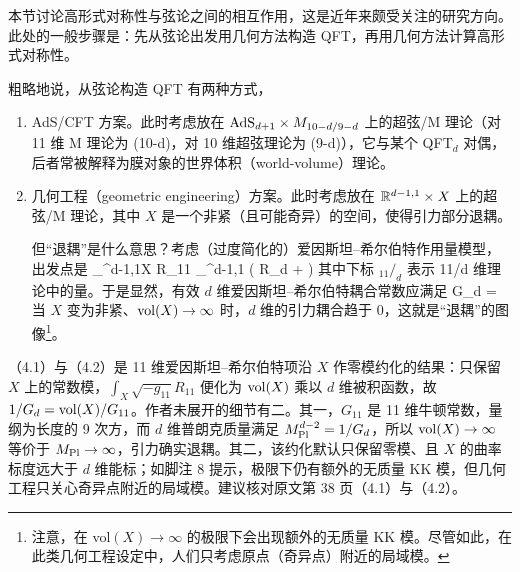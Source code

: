 本节讨论高形式对称性与弦论之间的相互作用，这是近年来颇受关注的研究方向\cite{DelZotto:2015isa,Bergman:2020ifi,Morrison:2020ool,Albertini:2020mdx,Bah:2020uev,Closset:2020scj,DelZotto:2020esg,Apruzzi:2020zot,Cvetic:2020kuw,BenettiGenolini:2020doj,Cordova:2020tij,DelZotto:2020sop,Gukov:2020btk,Heidenreich:2020pkc,Closset:2020afy,Apruzzi:2021phx,Apruzzi:2021vcu,Hosseini:2021ged,Cvetic:2021sxm,Buican:2021xhs,Braun:2021sex,Cvetic:2021maf,Cvetic:2021vsw,Apruzzi:2021mlh,Closset:2021lwy,Apruzzi:2021nmk,DelZotto:2022fnw,Genolini:2022mpi,Benini:2022hzx,Cvetic:2022imb,DelZotto:2022joo,Apruzzi:2022dlm,Hubner:2022kxr,Heckman:2022xgu,Heckman:2022suy,Damia:2022bcd,GarciaEtxebarria:2022vzq,Apruzzi:2022rei,vanBeest:2022fss,Heckman:2022muc,Antinucci:2022vyk,Grimm:2022xmj,Etheredge:2023ler,Amariti:2023hev,DelZotto:2023ahf,Acharya:2023bth,Cvetic:2023plv,Dierigl:2023jdp,Lawrie:2023tdz,Bah:2023ymy,Apruzzi:2023uma,Cvetic:2023pgm}。此处的一般步骤是：先从弦论出发用几何方法构造 QFT，再用几何方法计算高形式对称性。

粗略地说，从弦论构造 QFT 有两种方式，
\begin{enumerate}
    \item AdS/CFT 方案。此时考虑放在 ${\rm AdS}_{d+1} \times  M_{10-d / 9-d}$ 上的超弦/M 理论（对 11 维 M 理论为 (10-d)，对 10 维超弦理论为 (9-d)），它与某个 QFT$_d$ 对偶，后者常被解释为膜对象的世界体积（world-volume）理论。
    \item 几何工程（geometric engineering）方案。此时考虑放在 ${\mathbb{R}}^{d-1,1}\times X$ 上的超弦/M 理论，其中 $X$ 是一个非紧（且可能奇异）的空间，使得引力部分退耦。

    但“退耦”是什么意思？考虑（过度简化的）爱因斯坦–希尔伯特作用量模型，出发点是
    \be \int_{^{d-1,1}\times X}  R_{11}  \mapsto \int_{^{d-1,1}} ( R_{d} + \cdots)  \ee
    其中下标 $_{11}/ _{d}$ 表示 11/d 维理论中的量。于是显然，有效 $d$ 维爱因斯坦–希尔伯特耦合常数应满足
    \be G_d =  \ee
    当 $X$ 变为非紧、${\rm vol}(X)\to \infty$ 时，$d$ 维的引力耦合趋于 $0$，这就是“退耦”的图像\footnote{注意，在 vol$(X)\rightarrow\infty$ 的极限下会出现额外的无质量 KK 模。尽管如此，在此类几何工程设定中，人们只考虑原点（奇异点）附近的局域模。}。
\end{enumerate}

\begin{yizhu}
（4.1）与（4.2）是 11 维爱因斯坦–希尔伯特项沿 $X$ 作零模约化的结果：只保留 $X$ 上的常数模，$\int_X \sqrt{-g_{11}} R_{11}$ 便化为 ${\rm vol}(X)$ 乘以 $d$ 维被积函数，故 $1/G_d={\rm vol}(X)/G_{11}$。作者未展开的细节有二。其一，$G_{11}$ 是 11 维牛顿常数，量纲为长度的 9 次方，而 $d$ 维普朗克质量满足 $M_{\rm Pl}^{d-2}=1/G_d$，所以 ${\rm vol}(X)\to\infty$ 等价于 $M_{\rm Pl}\to\infty$，引力确实退耦。其二，该约化默认只保留零模、且 $X$ 的曲率标度远大于 $d$ 维能标；如脚注 8 提示，极限下仍有额外的无质量 KK 模，但几何工程只关心奇异点附近的局域模。建议核对原文第 38 页（4.1）与（4.2）。
\end{yizhu}

